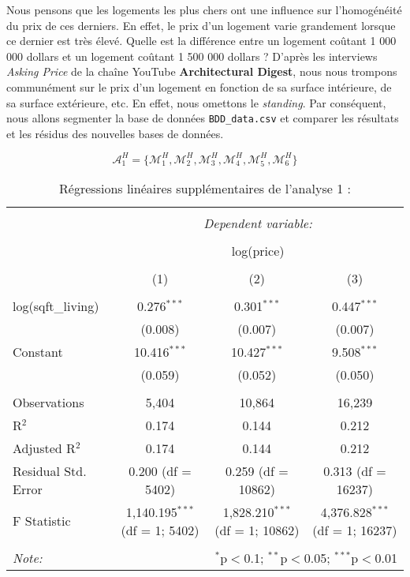\documentclass[
  11pt,
  french,
]{article}
\begin{document}
Nous pensons que les logements les plus chers ont une influence sur
l'homogénéité du prix de ces derniers. En effet, le prix d'un logement
varie grandement lorsque ce dernier est très élevé. Quelle est la
différence entre un logement coûtant 1 000 000 dollars et un logement
coûtant 1 500 000 dollars ? D'après les interviews \textit{Asking Price}
de la chaîne YouTube \textbf{Architectural Digest}, nous nous trompons
communément sur le prix d'un logement en fonction de sa surface
intérieure, de sa surface extérieure, etc. En effet, nous omettons le
\textit{standing}. Par conséquent, nous allons segmenter la base de
données \texttt{BDD\_data.csv} et comparer les résultats et les résidus
des nouvelles bases de données.

\newpage

\[\mathcal{A}_{1}^{H}=\{\mathcal{M}_{1}^{H},\mathcal{M}_{2}^{H},\mathcal{M}_{3}^{H},\mathcal{M}_{4}^{H},\mathcal{M}_{5}^{H},\mathcal{M}_{6}^{H}\}\]

\begin{table}[!htbp] \centering 
  \caption{Régressions linéaires supplémentaires de l'analyse 1 :} 
  \label{} 
\small 
\begin{tabular}{@{\extracolsep{1pt}}lccc} 
\\[-1.8ex]\hline 
\hline \\[-1.8ex] 
 & \multicolumn{3}{c}{\textit{Dependent variable:}} \\ 
\cline{2-4} 
\\[-1.8ex] & \multicolumn{3}{c}{log(price)} \\ 
\\[-1.8ex] & (1) & (2) & (3)\\ 
\hline \\[-1.8ex] 
 log(sqft\_living) & 0.276$^{***}$ & 0.301$^{***}$ & 0.447$^{***}$ \\ 
  & (0.008) & (0.007) & (0.007) \\ 
  Constant & 10.416$^{***}$ & 10.427$^{***}$ & 9.508$^{***}$ \\ 
  & (0.059) & (0.052) & (0.050) \\ 
 \hline \\[-1.8ex] 
Observations & 5,404 & 10,864 & 16,239 \\ 
R$^{2}$ & 0.174 & 0.144 & 0.212 \\ 
Adjusted R$^{2}$ & 0.174 & 0.144 & 0.212 \\ 
Residual Std. Error & 0.200 (df = 5402) & 0.259 (df = 10862) & 0.313 (df = 16237) \\ 
F Statistic & 1,140.195$^{***}$ (df = 1; 5402) & 1,828.210$^{***}$ (df = 1; 10862) & 4,376.828$^{***}$ (df = 1; 16237) \\ 
\hline 
\hline \\[-1.8ex] 
\textit{Note:}  & \multicolumn{3}{r}{$^{*}$p$<$0.1; $^{**}$p$<$0.05; $^{***}$p$<$0.01} \\ 
\end{tabular} 
\end{table}
\end{document}

